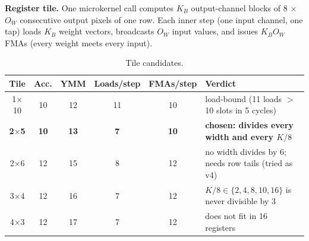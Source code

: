 \documentclass[10pt]{article}
\begin{document}
\textbf{Register tile.} One microkernel call computes $K_B$ output-channel blocks of 8 $\times$ $O_W$ consecutive output pixels of one row. Each inner step (one input channel, one tap) loads $K_B$ weight vectors, broadcasts $O_W$ input values, and issues $K_B O_W$ FMAs (every weight meets every input).
\begin{table}[H]\centering\small
\begin{tabular}{cccccl}
\toprule
Tile & Acc. & YMM & Loads/step & FMAs/step & Verdict\\
\midrule
1$\times$10 & 10 & 12 & 11 & 10 & load-bound (11 loads $>$ 10 slots in 5 cycles)\\
\textbf{2$\times$5} & \textbf{10} & \textbf{13} & \textbf{7} & \textbf{10} & \textbf{chosen: divides every width and every $K/8$}\\
2$\times$6 & 12 & 15 & 8 & 12 & no width divides by 6; needs row tails (tried as v4)\\
3$\times$4 & 12 & 16 & 7 & 12 & $K/8 \in \{2,4,8,10,16\}$ is never divisible by 3\\
4$\times$3 & 12 & 17 & 7 & 12 & does not fit in 16 registers\\
\bottomrule
\end{tabular}
\caption{Tile candidates.}
\end{table}
\end{document}
